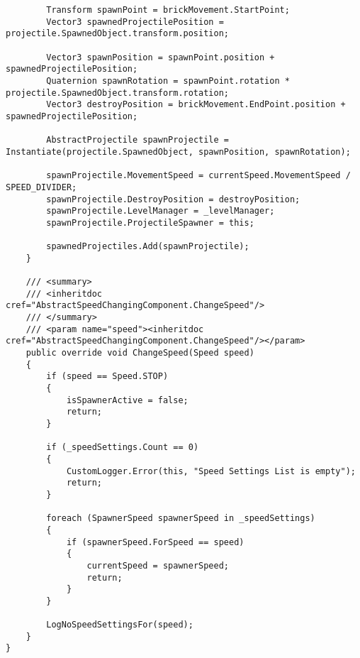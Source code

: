 \begin{verbatim}
        Transform spawnPoint = brickMovement.StartPoint;
        Vector3 spawnedProjectilePosition = projectile.SpawnedObject.transform.position;

        Vector3 spawnPosition = spawnPoint.position + spawnedProjectilePosition;
        Quaternion spawnRotation = spawnPoint.rotation * projectile.SpawnedObject.transform.rotation;
        Vector3 destroyPosition = brickMovement.EndPoint.position + spawnedProjectilePosition;

        AbstractProjectile spawnProjectile = Instantiate(projectile.SpawnedObject, spawnPosition, spawnRotation);

        spawnProjectile.MovementSpeed = currentSpeed.MovementSpeed / SPEED_DIVIDER;
        spawnProjectile.DestroyPosition = destroyPosition;
        spawnProjectile.LevelManager = _levelManager;
        spawnProjectile.ProjectileSpawner = this;

        spawnedProjectiles.Add(spawnProjectile);
    }

    /// <summary>
    /// <inheritdoc cref="AbstractSpeedChangingComponent.ChangeSpeed"/>
    /// </summary>
    /// <param name="speed"><inheritdoc cref="AbstractSpeedChangingComponent.ChangeSpeed"/></param>
    public override void ChangeSpeed(Speed speed)
    {
        if (speed == Speed.STOP)
        {
            isSpawnerActive = false;
            return;
        }

        if (_speedSettings.Count == 0)
        {
            CustomLogger.Error(this, "Speed Settings List is empty");
            return;
        }

        foreach (SpawnerSpeed spawnerSpeed in _speedSettings)
        {
            if (spawnerSpeed.ForSpeed == speed)
            {
                currentSpeed = spawnerSpeed;
                return;
            }
        }

        LogNoSpeedSettingsFor(speed);
    }
}
\end{verbatim}

